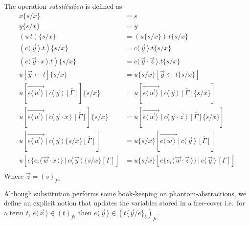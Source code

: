 \documentclass[a4paper,UKenglish,cleveref, autoref]{lipics-v2019}
\newcommand{\fv}[1]{(#1)_{fv}}
\newcommand{\fc}[1]{(#1)_{fc}}
\newcommand{\app}[2]{#1 \, #2}
\newcommand{\fake}[3]{#1 \langle \, #2 \, \rangle . #3}
\newcommand{\share}[3]{#1 [#2 \leftarrow #3]}
\newcommand{\dist}[5]{#1 [ #2 \, \vert \, \fakedist{#4}{#5} \, #3 ]}
\newcommand{\fakedist}[2]{#1 \langle \, #2 \, \rangle}
\newcommand{\vecdist}[2]{\overrightarrow{\fakedist{#1}{#2} \,}}
\newcommand{\sub}[3]{#1 \{ #2 / #3 \}}
\newcommand{\psub}[3]{#1 \{ #2 / #3 \}_{b}}
\begin{document}
\begin{definition}[Substitution] The operation \emph{substitution} is defined as
\label{def:sub}
\begingroup
\allowdisplaybreaks
	\begin{align*}
		\sub{x}{s}{x}	&=	s \\
		\sub{y}{s}{x} 	&= 	y \\
		\sub{(\app{u}{t})}{s}{x} &= \app{(\sub{u}{s}{x})}{\sub{t}{s}{x}} \\
		\sub{(\fake{c}{\vec{y}}{t})}{s}{x} &= \fake{c}{\vec{y}}{\sub{t}{s}{x}} \\
		\sub{(\fake{c}{\vec{y} \cdot x}{t})}{s}{x} &= \fake{c}{\vec{y} \cdot \vec{z}}{\sub{t}{s}{x}} \\
		\sub{\share{u}{\vec{y}}{t}}{s}{x} &= \share{\sub{u}{s}{x}}{\vec{y}}{\sub{t}{s}{x}} \\
		\sub{\dist{u}{\vecdist{e}{\vec{w}}}{\overline{[\Gamma]}}{c}{\vec{y}}}{s}{x} &= \dist{u}{\vecdist{e}{\vec{w}}}{\overline{[\Gamma]} \sub{}{s}{x}}{c}{\vec{y}} \\
		\sub{\dist{u}{\vecdist{e}{\vec{w}}}{\overline{[\Gamma]}}{c}{\vec{y} \cdot x}}{s}{x} &= \dist{u}{\vecdist{e}{\vec{w}}}{\overline{[\Gamma]}\sub{}{s}{x}}{c}{\vec{y} \cdot \vec{z}} \\
		\dist{u}{\vecdist{e}{\vec{w}}}{\sub{}{s}{x}\overline{[\Gamma]}}{c}{\vec{y}} &= \dist{\sub{u}{s}{x}}{\vecdist{e}{\vec{w}}}{\overline{[\Gamma]}}{c}{\vec{y}} \\
		\dist{u}{e \{ \fakedist{e_{i}}{\vec{w} \cdot x }\}}{\sub{}{s}{x} \overline{[\Gamma]}}{c}{\vec{y}} &= \dist{\sub{u}{s}{x}}{e\{ \fakedist{e_{i}}{ \vec{w} \cdot \vec{z}} \}}{\overline{[\Gamma]}}{c}{\vec{y}} \\
	\end{align*}
\vspace{-1cm}
\newline
\noindent Where $\vec{z} = \fv{s}$
\endgroup
\end{definition}

Although substitution performs some book-keeping on phantom-abstractions, we define an explicit notion that updates the variables stored in a free-cover i.e.\ for a term $t$, $\fakedist{e}{\vec{x}} \in \fc{t}$ then $\fakedist{e}{\vec{y}} \in \fc{\psub{t}{\vec{y}}{e}}$.
\end{document}
